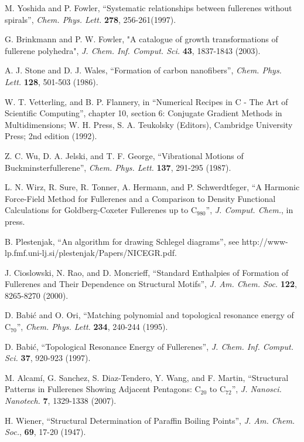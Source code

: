 \documentclass[article,a4paper,twoside]{memoir}
\newcommand{\C}[1]{\ensuremath{\mathrm{C}_{#1}}}
\begin{document}
\begin{thebibliography}{99}
 M. Yoshida and P. Fowler, ``Systematic relationships between fullerenes without spirals'', \textit{Chem. Phys. Lett.} \textbf{278}, 256-261(1997).

 G. Brinkmann and P. W. Fowler, "A catalogue of growth transformations of fullerene polyhedra",
\textit{J. Chem. Inf. Comput. Sci.} \textbf{43}, 1837-1843 (2003).

 A. J. Stone and D. J. Wales, ``Formation of carbon nanofibers'', \textit{Chem. Phys. Lett.} \textbf{128}, 501-503 (1986).

 W. T. Vetterling, and B. P. Flannery, in ``Numerical Recipes in C - The Art of Scientific Computing'', chapter 10, section 6: Conjugate Gradient Methods in Multidimensions; W. H. Press, S. A. Teukolsky (Editors), Cambridge University Press; 2nd edition (1992).

 Z. C. Wu, D. A. Jelski, and T. F. George, ``Vibrational Motions of
Buckminsterfullerene'', \textit{Chem. Phys. Lett.} \textbf{137}, 291-295 (1987).

 L. N. Wirz, R. Sure, R. Tonner, A. Hermann, and P. Schwerdtfeger, ``A Harmonic Force-Field Method for Fullerenes and a Comparison to Density Functional Calculations for Goldberg-Coxeter Fullerenes up to C$_{980}$'', \textit{J. Comput. Chem.}, in press.

 B. Plestenjak, ``An algorithm for drawing Schlegel diagrams'', see http://www-lp.fmf.uni-lj.si/plestenjak/Papers/NICEGR.pdf.

 J. Cioslowski, N. Rao, and D. Moncrieff, ``Standard Enthalpies of Formation of Fullerenes and Their
Dependence on Structural Motifs'', \textit{J. Am. Chem. Soc.} \textbf{122}, 8265-8270 (2000).

 D. Babi\'c and O. Ori, ``Matching polynomial and topological resonance energy of \C{70}'', \textit{Chem. Phys. Lett.} \textbf{234}, 240-244 (1995).

 D. Babi\'c, ``Topological Resonance Energy of Fullerenes'', \textit{J. Chem. Inf. Comput. Sci.} \textbf{37}, 920-923 (1997).

 M. Alcam\'i, G. Sanchez, S. Diaz-Tendero, Y. Wang, and F. Martin, ``Structural Patterns in Fullerenes Showing
Adjacent Pentagons: \C{20} to \C{72}'', \textit{J. Nanosci. Nanotech.} \textbf{7}, 1329-1338 (2007).

 H. Wiener, ``Structural Determination of Paraffin Boiling Points'', \textit{J. Am. Chem. Soc.}, \textbf{69}, 17-20 (1947).


\end{thebibliography}
\end{document}
